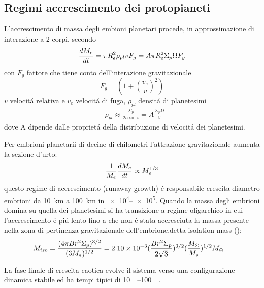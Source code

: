 \begin{reworking}
\subsection{Regimi accrescimento dei protopianeti}

L'accrescimento di massa degli embioni planetari procede, in approssimazione di interazione a 2 corpi, secondo
\begin{equation}
\TDy{t}{M_e}=\pi R_e^2\rho_{pl}v F_g=A\pi R_e^2\Sigma_p\Omega F_g\label{eq:Gaccretionpl}
\end{equation}
con $F_g$ fattore che tiene conto dell'interazione gravitazionale
\begin{equation}
F_g=(1+(\frac{v_e}{v})^2)
\end{equation}
$v$ velocit\'a relativa e $v_e$ velocit\'a di fuga, $\rho_{pl}$ densit\'a di planetesimi
\begin{align}
&\rho_{pl}\approx\frac{\Sigma_p}{2a\sin{i}}=A\frac{\Sigma_p\Omega}{v}
\end{align}
dove A dipende dalle propriet\'a della distribuzione di velocit\'a dei planetesimi.

Per embrioni planetarii di decine di chilometri l'attrazione gravitazionale aumenta la sezione d'urto: 
\begin{equation}
\frac{1}{M_e}\TDy{t}{M_e}\propto M_e\expy{1/3}
\end{equation}
questo regime di accrescimento (runaway growth) \'e responsabile crescita diametro embrioni da \SI{10}{\kilo\meter} a \SI{100}{\kilo\meter} in \SIrange{e4}{e5}{\year}.
Quando la massa degli embrioni domina su quella dei planetesimi si ha transizione a regime oligarchico in cui l'accrescimento \'e pi\'u lento fino a che non \'e stata accresciuta la massa presente nella zona di pertinenza gravitazionale dell'embrione,detta isolation mass (\cite{lissauer1993planet}):
\begin{align}
&M_{iso}=\frac{(4\pi Br^2\Sigma_p)\expy{3/2}}{(3M_*)\expy{1/2}}=\num{2.10e-3}(\frac{Br^2\Sigma_p}{2\sqrt{3}})\expy{3/2}(\frac{\msun{}}{M_*})\expy{1/2}\mearth{}
\end{align}

La fase finale di crescita caotica evolve il sistema verso una configurazione dinamica stabile ed ha tempi tipici di \SIrange{10}{100}{\mega\year}.

\end{reworking}

